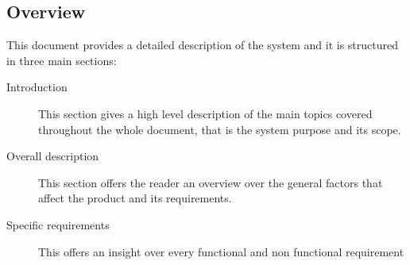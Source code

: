 
\subsection{Overview}
This document provides a detailed description of the system and it is structured in three main sections:

\begin{description}
  \item[Introduction] This section gives a high level description of the main topics covered throughout the whole document, that is the system purpose and its scope.
  \item[Overall description] This section offers the reader an overview over the general factors that affect the product and its requirements.
  \item[Specific requirements] This offers an insight over every functional and non functional requirement
\end{description}